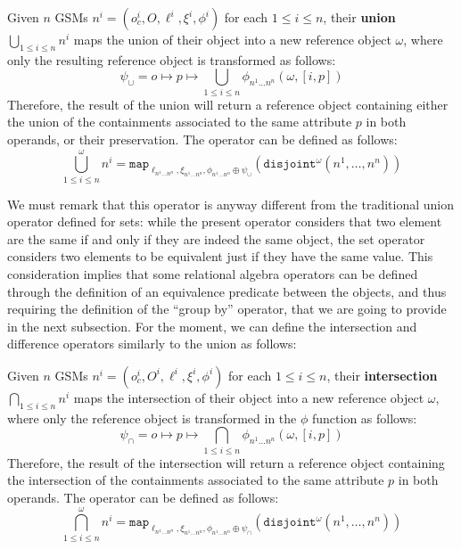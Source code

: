 \begin{definition}[Union]\label{def:gsmunion}
	Given $n$ GSMs  $n^i=(o_c^i,O,\ell^i,\xi^i,\phi^i)$ for each $1\leq i\leq n$, their \textbf{union} $\bigcup_{1\leq i\leq n}n^i$ maps the union of their object into a new reference object $\omega$, where only the resulting reference object is transformed as follows:
	\[\psi_\cup=o\mapsto p\mapsto\bigcup_{1\leq i\leq n}\phi_{n^1\dots n^n}(\omega,[i,p])\]
	Therefore, the result of the union will return a reference object containing either the union of the containments associated to the same attribute $p$ in both operands, or their preservation. The operator can be defined as follows:
	\[\bigcup_{1\leq i\leq n}^\omega n^i=\texttt{map}_{\ell_{n^1\dots n^n},\xi_{n^1\dots n^n},\phi_{n^1\dots n^n}\oplus \psi_\cup}(\texttt{disjoint}^\omega(n^1,\dots,n^n))\]
\end{definition}

We must remark that this operator is anyway different from the traditional union operator defined for sets: while the present operator considers that two element are the same if and only if they are indeed the same object, the set operator considers two elements to be equivalent just if they have the same value. This consideration implies that some relational algebra operators can be defined through the definition of an equivalence predicate between the objects, and thus requiring the definition of the ``group by'' operator, that we are going to provide in the next subsection. For the moment, we can define the intersection and difference operators similarly to the union as follows:
\begin{definition}[Intersection]
	Given $n$ GSMs  $n^i=(o_c^i,O^i,\ell^i,\xi^i,\phi^i)$ for each $1\leq i\leq n$, their \textbf{intersection} $\bigcap_{1\leq i\leq n}n^i$ maps the intersection of their object into a new reference object $\omega$, where only the reference object is transformed in the $\phi$ function as follows:
	\[\psi_\cap=o\mapsto p\mapsto\bigcap_{1\leq i\leq n}\phi_{n^1\dots n^n}(\omega,[i,p])\]
	Therefore, the result of the intersection will return a reference object containing the intersection of the containments associated to the same attribute $p$ in both operands. The operator can be defined as follows:
	\[\bigcap_{1\leq i\leq n}^\omega n^i=\texttt{map}_{\ell_{n^1\dots n^n},\xi_{n^1\dots n^n},\phi_{n^1\dots n^n}\oplus \psi_\cap}(\texttt{disjoint}^\omega(n^1,\dots,n^n))\]
\end{definition}

